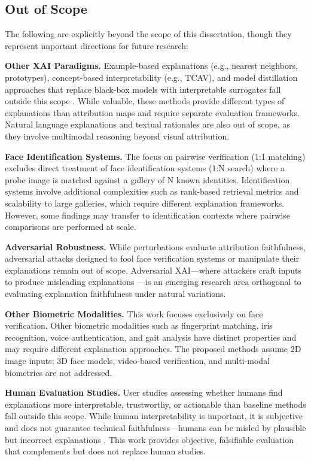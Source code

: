 \subsection{Out of Scope}

The following are explicitly beyond the scope of this dissertation, though they represent important directions for future research:

\textbf{Other XAI Paradigms.} Example-based explanations (e.g., nearest neighbors, prototypes), concept-based interpretability (e.g., TCAV), and model distillation approaches that replace black-box models with interpretable surrogates fall outside this scope \cite{chen2019prototypes,kim2018tcav}. While valuable, these methods provide different types of explanations than attribution maps and require separate evaluation frameworks. Natural language explanations and textual rationales are also out of scope, as they involve multimodal reasoning beyond visual attribution.

\textbf{Face Identification Systems.} The focus on pairwise verification (1:1 matching) excludes direct treatment of face identification systems (1:N search) where a probe image is matched against a gallery of N known identities. Identification systems involve additional complexities such as rank-based retrieval metrics and scalability to large galleries, which require different explanation frameworks. However, some findings may transfer to identification contexts where pairwise comparisons are performed at scale.

\textbf{Adversarial Robustness.} While perturbations evaluate attribution faithfulness, adversarial attacks designed to fool face verification systems or manipulate their explanations remain out of scope. Adversarial XAI---where attackers craft inputs to produce misleading explanations \cite{slack2020fooling,dombrowski2019explanations}---is an emerging research area orthogonal to evaluating explanation faithfulness under natural variations.

\textbf{Other Biometric Modalities.} This work focuses exclusively on face verification. Other biometric modalities such as fingerprint matching, iris recognition, voice authentication, and gait analysis have distinct properties and may require different explanation approaches. The proposed methods assume 2D image inputs; 3D face models, video-based verification, and multi-modal biometrics are not addressed.

\textbf{Human Evaluation Studies.} User studies assessing whether humans find explanations more interpretable, trustworthy, or actionable than baseline methods fall outside this scope. While human interpretability is important, it is subjective and does not guarantee technical faithfulness---humans can be misled by plausible but incorrect explanations \cite{lage2019human,poursabzisangdeh2021manipulating}. This work provides objective, falsifiable evaluation that complements but does not replace human studies.

